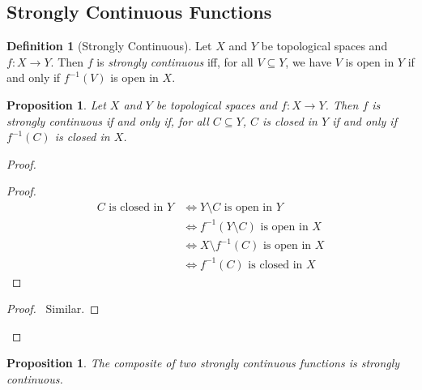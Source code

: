 \documentclass{report}
\let\qed\relax
\newtheorem{prop}[lm]{Proposition}
\theoremstyle{definition}
\newtheorem{df}[lm]{Definition}
\begin{document}
  \subsection{Strongly Continuous Functions}

  \begin{df}[Strongly Continuous]
    Let $X$ and $Y$ be topological spaces and $f : X \rightarrow Y$. Then $f$
    is
    \emph{strongly continuous} iff, for all $V \subseteq Y$, we have $V$ is
    open
    in $Y$ if and only if $f^{-1}(V)$ is open in $X$.
  \end{df}

  \begin{prop}
    \label{prop:topology:strongly_continuous:closed}
    Let $X$ and $Y$ be topological spaces and $f : X \rightarrow Y$. Then $f$
    is
    strongly continuous if and only if, for all $C \subseteq Y$, $C$ is closed
    in
    $Y$ if and only if $f^{-1}(C)$ is closed in $X$.
  \end{prop}

  \begin{proof}
    \pf
    \begin{proof}
      \pf
      \begin{align*}
        C \text{ is closed in } Y & \Leftrightarrow Y \setminus C \text{ is
          open in } Y \\
        & \Leftrightarrow f^{-1}(Y \setminus C) \text{ is open in } X \\
        & \Leftrightarrow X \setminus f^{-1}(C) \text{ is open in } X \\
        & \Leftrightarrow f^{-1}(C) \text{ is closed in } X
      \end{align*}
    \end{proof}
    \begin{proof}
      \pf\ Similar.
    \end{proof}
    \qed
  \end{proof}

  \begin{prop}
    \label{prop:topology:strongly_continuous:composite}
    The composite of two strongly continuous functions is strongly continuous.
  \end{prop}
\end{document}
